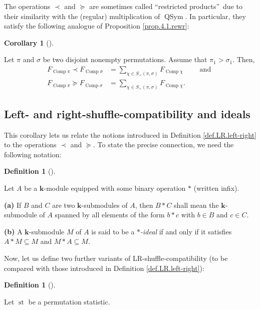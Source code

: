 \documentclass[numbers=enddot,12pt,final,onecolumn,notitlepage]{scrartcl}%
\theoremstyle{definition}
\newtheorem{defi}[theo]{Definition}
\newenvironment{definition}[1][]
{\begin{defi}[#1]\begin{leftbar}}
{\end{leftbar}\end{defi}}
\newtheorem{coro}[theo]{Corollary}
\newenvironment{corollary}[1][]
{\begin{coro}[#1]\begin{leftbar}}
{\end{leftbar}\end{coro}}
\newenvironment{vershort}{}{}
\let\sumnonlimits\sum
\renewcommand{\sum}{\sumnonlimits\limits}
\begin{document}
\begin{vershort}
The operations $\left.  \prec\right.  $ and $\left.  \succeq\right.  $ are
sometimes called \textquotedblleft restricted products\textquotedblright\ due
to their similarity with the (regular) multiplication of $\operatorname*{QSym}%
$. In particular, they satisfy the following analogue of Proposition
\ref{prop.4.1.rewr}:

\begin{corollary}
Let $\pi$ and $\sigma$ be two disjoint nonempty permutations. Assume that
$\pi_{1}>\sigma_{1}$. Then,%
\begin{align*}
F_{\operatorname*{Comp}\pi}\left.  \prec\right.  F_{\operatorname*{Comp}%
\sigma}
&=\sum_{\chi\in S_{\prec}\left(  \pi,\sigma\right)  }%
F_{\operatorname*{Comp}\chi}  \qquad \text{ and } \\
F_{\operatorname*{Comp}\pi}\left.  \succeq\right.  F_{\operatorname*{Comp}%
\sigma}
&=\sum_{\chi\in S_{\succ}\left(  \pi,\sigma\right)  }%
F_{\operatorname*{Comp}\chi}.
\end{align*}

\end{corollary}

\subsection{Left- and right-shuffle-compatibility and ideals}

This corollary lets us relate the notions introduced in Definition
\ref{def.LR.left-right} to the operations $\left.  \prec\right.  $ and
$\left.  \succeq\right.  $. To state the precise connection, we need the
following notation:

\begin{definition}
Let $A$ be a $\mathbf{k}$-module equipped with some binary operation $\ast$
(written infix).

\textbf{(a)} If $B$ and $C$ are two $\mathbf{k}$-submodules of $A$, then
$B\ast C$ shall mean the $\mathbf{k}$-submodule of $A$ spanned by all elements
of the form $b\ast c$ with $b\in B$ and $c\in C$.

\textbf{(b)} A $\mathbf{k}$-submodule $M$ of $A$ is said to be a\textit{
}$\ast$\textit{-ideal} if and only if it satisfies $A\ast M\subseteq M$ and
$M\ast A\subseteq M$.
\end{definition}

Now, let us define two further variants of LR-shuffle-compatibility (to be
compared with those introduced in Definition \ref{def.LR.left-right}):

\begin{definition}
Let $\operatorname*{st}$ be a permutation statistic.


\end{definition}
\end{vershort}
\end{document}
